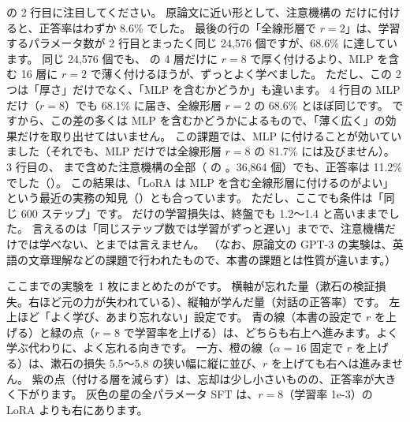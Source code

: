 の 2 行目に注目してください。
原論文に近い形として、注意機構の  だけに付けると、正答率はわずか 8.6\% でした。
最後の行の「全線形層で $r=2$」は、学習するパラメータ数が 2 行目とまったく同じ 24,576 個ですが、68.6\% に達しています。
同じ 24,576 個でも、 の 4 層だけに $r=8$ で厚く付けるより、MLP を含む 16 層に $r=2$ で薄く付けるほうが、ずっとよく学べました。
ただし、この 2 つは「厚さ」だけでなく、「MLP を含むかどうか」も違います。
4 行目の MLP だけ（$r=8$）でも 68.1\% に届き、全線形層 $r=2$ の 68.6\% とほぼ同じです。
ですから、この差の多くは MLP を含むかどうかによるもので、「薄く広く」の効果だけを取り出せてはいません。
この課題では、MLP に付けることが効いていました（それでも、MLP だけでは全線形層 $r=8$ の 81.7\% には及びません）。
3 行目の、 まで含めた注意機構の全部（ の 。36,864 個）でも、正答率は 11.2\% でした（）。
この結果は、「LoRA は MLP を含む全線形層に付けるのがよい」という最近の実務の知見（）とも合っています。
ただし、ここでも条件は「同じ 600 ステップ」です。
 だけの学習損失は、終盤でも 1.2〜1.4 と高いままでした。
言えるのは「同じステップ数では学習がずっと遅い」までで、注意機構だけでは学べない、とまでは言えません。
（なお、原論文の GPT-3 の実験は、英語の文章理解などの課題で行われたもので、本書の課題とは性質が違います。）

ここまでの実験を 1 枚にまとめたのがです。
横軸が忘れた量（漱石の検証損失。右ほど元の力が失われている）、縦軸が学んだ量（対話の正答率）です。
左上ほど「よく学び、あまり忘れない」設定です。
青の線（本書の設定で $r$ を上げる）と緑の点（$r=8$ で学習率を上げる）は、どちらも右上へ進みます。よく学ぶ代わりに、よく忘れる向きです。
一方、橙の線（$\alpha=16$ 固定で $r$ を上げる）は、漱石の損失 5.5〜5.8 の狭い幅に縦に並び、$r$ を上げても右へは進みません。
紫の点（付ける層を減らす）は、忘却は少し小さいものの、正答率が大きく下がります。
灰色の星の全パラメータ SFT は、$r=8$（学習率 1e-3）の LoRA よりも右にあります。

